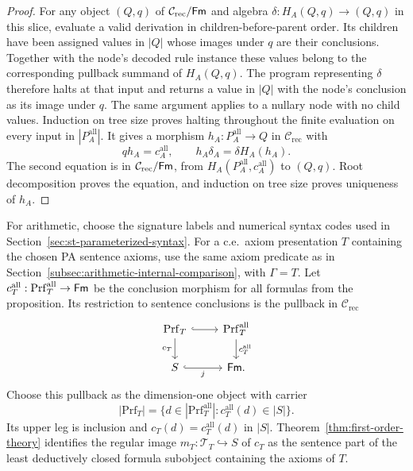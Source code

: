 \begin{proof}
For any object $(Q,q)$ of $\mathcal C_{\mathrm{rec}}/\mathsf{Fm}$ and
algebra $\delta:H_A(Q,q)\to(Q,q)$ in this slice,
evaluate a valid derivation in children-before-parent order.
Its children have been assigned values in $|Q|$ whose
images under $q$ are their conclusions. Together with the node's
decoded rule instance these values belong to the corresponding pullback
summand of $H_A(Q,q)$. The program representing $\delta$ therefore
halts at that input and returns a value in $|Q|$ with the node's
conclusion as its image under $q$. The same argument applies to
a nullary node with no child values. Induction on tree size proves
halting throughout the finite evaluation on every input in
$|P_A^{\mathrm{all}}|$. It gives a morphism
$h_A:P_A^{\mathrm{all}}\to Q$ in $\mathcal C_{\mathrm{rec}}$ with
\[
 qh_A=c_A^{\mathrm{all}},\qquad
 h_A\delta_A=\delta H_A(h_A).
\]
The second equation is in $\mathcal C_{\mathrm{rec}}/\mathsf{Fm}$, from
$H_A(P_A^{\mathrm{all}},c_A^{\mathrm{all}})$ to $(Q,q)$.
Root decomposition proves the equation, and induction on tree
size proves uniqueness of $h_A$.
\end{proof}

For arithmetic, choose the signature labels and numerical
syntax codes used in Section~\ref{sec:st-parameterized-syntax}.
For a c.e.\ axiom presentation $T$ containing the chosen PA sentence
axioms, use the same axiom predicate as in
Section~\ref{subsec:arithmetic-internal-comparison}, with $\Gamma=T$.
Let
$c_T^{\mathrm{all}}:\mathrm{Prf}_T^{\mathrm{all}}\to\mathsf{Fm}$
be the conclusion morphism for all formulas from the proposition.
Its restriction to sentence conclusions is the pullback in $\mathcal C_{\mathrm{rec}}$
\[
\begin{tikzcd}
 \mathrm{Prf}_T\arrow[r,hook]\arrow[d,"c_T"'] &
 \mathrm{Prf}_T^{\mathrm{all}}\arrow[d,"c_T^{\mathrm{all}}"]\\
 S\arrow[r,hook,"j"'] & \Fm.
\end{tikzcd}
\]
Choose this pullback as the dimension-one object with carrier
\[
 |\mathrm{Prf}_T|
  =\{d\in|\mathrm{Prf}_T^{\mathrm{all}}|:
                 c_T^{\mathrm{all}}(d)\in |S|\}.
\]
Its upper leg is inclusion and $c_T(d)=c_T^{\mathrm{all}}(d)$
in $|S|$. Theorem~\ref{thm:first-order-theory}
identifies the regular image $m_T:\mathcal T_T\hookrightarrow S$
of $c_T$ as the sentence part of the least deductively closed
formula subobject containing the axioms of $T$.

